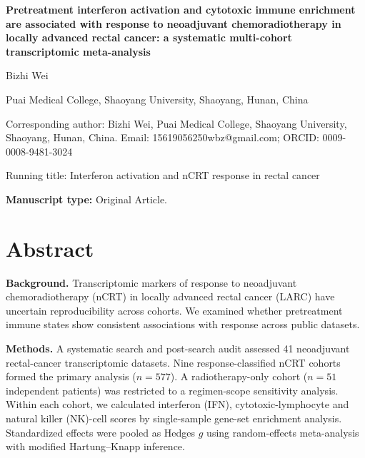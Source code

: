 \documentclass[11pt,a4paper]{article}
\begin{document}
\begin{center}
{\LARGE\bfseries Pretreatment interferon activation and cytotoxic immune enrichment are associated with response to neoadjuvant chemoradiotherapy in locally advanced rectal cancer: a systematic multi-cohort transcriptomic meta-analysis\par}
\vspace{1.2em}
{\large Bizhi Wei\par}
\vspace{0.4em}
{\small Puai Medical College, Shaoyang University, Shaoyang, Hunan, China\par}
\vspace{0.4em}
{\small Corresponding author: Bizhi Wei, Puai Medical College, Shaoyang University, Shaoyang, Hunan, China. Email: 15619056250wbz@gmail.com; ORCID: 0009-0008-9481-3024\par}
\vspace{0.4em}
{\small Running title: Interferon activation and nCRT response in rectal cancer\par}
\end{center}

\vspace{0.8em}
\noindent\textbf{Manuscript type:} Original Article.

\section*{Abstract}
\noindent\textbf{Background.} Transcriptomic markers of response to neoadjuvant chemoradiotherapy (nCRT) in locally advanced rectal cancer (LARC) have uncertain reproducibility across cohorts. We examined whether pretreatment immune states show consistent associations with response across public datasets.

\noindent\textbf{Methods.} A systematic search and post-search audit assessed 41 neoadjuvant rectal-cancer transcriptomic datasets. Nine response-classified nCRT cohorts formed the primary analysis ($n=577$). A radiotherapy-only cohort ($n=51$ independent patients) was restricted to a regimen-scope sensitivity analysis. Within each cohort, we calculated interferon (IFN), cytotoxic-lymphocyte and natural killer (NK)-cell scores by single-sample gene-set enrichment analysis. Standardized effects were pooled as Hedges $g$ using random-effects meta-analysis with modified Hartung--Knapp inference.
\end{document}

